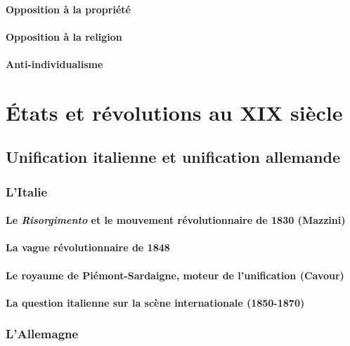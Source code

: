 \documentclass[12pt]{report}
\begin{document}
\subsubsection{Opposition à la propriété}

\subsubsection{Opposition à la religion}

\subsubsection{Anti-individualisme}


\chapter{États et révolutions au XIX siècle}

\section{Unification italienne et unification allemande}

\subsection{L'Italie}

\subsubsection{Le \emph{Risorgimento} et le mouvement révolutionnaire de 1830 (Mazzini)}

\subsubsection{La vague révolutionnaire de 1848}

\subsubsection{Le royaume de Piémont-Sardaigne, moteur de l'unification (Cavour)}

\subsubsection{La question italienne sur la scène internationale (1850-1870)}

\subsection{L'Allemagne}
\end{document}

